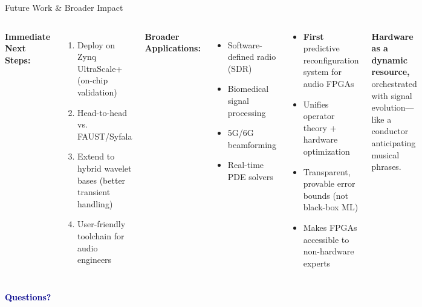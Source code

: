 \documentclass[aspectratio=169,11pt]{beamer}
\begin{document}
\begin{frame}{Future Work \& Broader Impact}

\begin{columns}[T]

\textbf{Immediate Next Steps:}
\begin{enumerate}
    \item Deploy on Zynq UltraScale+ (on-chip validation)
    \item Head-to-head vs. FAUST/Syfala
    \item Extend to hybrid wavelet bases (better transient handling)
    \item User-friendly toolchain for audio engineers
\end{enumerate}

\vspace{0.3cm}

\textbf{Broader Applications:}
\begin{itemize}
    \item Software-defined radio (SDR)
    \item Biomedical signal processing
    \item 5G/6G beamforming
    \item Real-time PDE solvers
\end{itemize}


\begin{tcolorbox}[colback=orange!15,colframe=orange!80,title=\textbf{Why This Is Novel}]
\begin{itemize}
    \item \textbf{First} predictive reconfiguration system for audio FPGAs
    \item Unifies operator theory + hardware optimization
    \item Transparent, provable error bounds (not black-box ML)
    \item Makes FPGAs accessible to non-hardware experts
\end{itemize}
\end{tcolorbox}

\vspace{0.3cm}

\begin{tcolorbox}[colback=green!15,colframe=green!70,title=\textbf{Vision}]
\centering
\textbf{Hardware as a dynamic resource,}\\
orchestrated with signal evolution—\\
like a conductor anticipating musical phrases.
\end{tcolorbox}

\end{columns}

\vspace{0.3cm}
\centering
\textcolor{darkblue}{\Large\textbf{Questions?}}

\end{frame}
\end{document}
